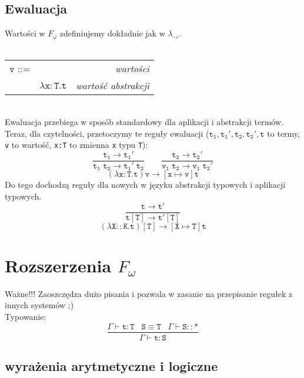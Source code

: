 \documentclass[11pt,leqno]{article}
\begin{document}
\subsection{Ewaluacja}

Wartości w $F_\omega$ zdefiniujemy dokładnie jak w $\lambda_{\rightarrow}$. \\ \\
\begin{tabular}{| l c r |}
  \hline
  $\mathtt{v}$ ::= &  & \textit{wartości}  \\
   & $\mathtt{\lambda x:T.t}$ & \textit{wartość abstrakcji} \\
  \hline
\end{tabular} \\

Ewaluacja przebiega w sposób standardowy dla aplikacji i abstrakcji termów. Teraz, dla czytelności, przetoczymy te reguły ewaluacji ($\mathtt{t_1,t_1',t_2,t_2',t}$ to termy, \texttt{v} to wartość, \texttt{x:T} to zmienna \texttt{x} typu \texttt{T}):
	\[\mathtt{
		\frac{t_1 \longrightarrow t_1'}{t_1\;t_2 \longrightarrow t_1'\;t_2}
                \qquad
                \frac{t_2 \longrightarrow t_2'}{v_1\;t_2 \longrightarrow v_1\;t_2'}}
	\]
 	\[\mathtt{
		(\lambda x:T.t)v \longrightarrow [x \mapsto v]t}
	\]
Do tego dochodzą reguły dla nowych w języku abstrakcji typowych i aplikacji typowych.
	\[\mathtt{
		\frac{t \longrightarrow t'}{t[T] \longrightarrow t'[T]}}
	\]
 	\[\mathtt{
		(\lambda X::K.t)[T] \longrightarrow [X \mapsto T]t}
	\]

\section{Rozszerzenia $F_\omega$}
\setcounter{equation}{0}
Ważne!!! Zaoszczędza dużo pisania i pozwala w zasanie na przepisanie regułek z innych systemów ;) \\
Typowanie:
 	\[\mathtt{ \frac{\Gamma \vdash t:T \;\;\; S\equiv T \;\;\; \Gamma \vdash S::\ast}{\Gamma \vdash t:S}
		}
	\]

\subsection{wyrażenia arytmetyczne i logiczne}
\end{document}

